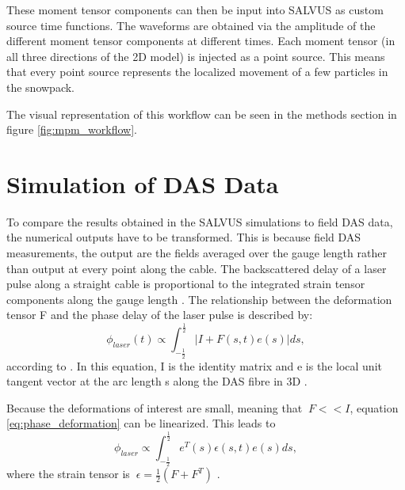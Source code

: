 These moment tensor components can then be input into SALVUS as custom source time functions. The waveforms are obtained via the amplitude of the different moment tensor components at different times. Each moment tensor (in all three directions of the 2D model) is injected as a point source. This means that every point source represents the localized movement of a few particles in the snowpack. \par

The visual representation of this workflow can be seen in the methods section in figure  \ref{fig:mpm_workflow}. 

\section{Simulation of DAS Data}
\label{sec:das_theory}

To compare the results obtained in the SALVUS simulations to field DAS data, the numerical outputs have to be transformed. This is because field DAS measurements, the output are the fields averaged over the gauge length \parencite{lindseyFiberOpticSeismology2021} rather than output at every point along the cable. The backscattered delay of a laser pulse along a straight cable is proportional to the integrated strain tensor components along the gauge length \parencite{noeFrontiersFullwaveformSeismology2025}. The relationship between the deformation tensor F and the phase delay of the laser pulse is described by: \begin{equation}
  \phi_{laser}(t) \propto \int_{-\frac{1}{2}}^{\frac{1}{2}} |I+F(s,t)e(s)|ds
  \label{eq:phase_deformation},
\end{equation} according to \cite{fichtnerTheoryPhaseTransmission2022}. In this equation, I is the identity matrix and e is the local unit tangent vector at the arc length s along the DAS fibre in 3D \parencite{noeFrontiersFullwaveformSeismology2025}. \par 

Because the deformations of interest are small, meaning that $\ F << I$, equation \ref{eq:phase_deformation} can be linearized. This leads to \begin{equation}
  \phi_{laser} \propto \int_{-\frac{1}{2}}^{\frac{1}{2}}e^T(s)\epsilon(s,t)e(s)ds
  \label{eq:linearized_phase_deformation},
\end{equation} where the strain tensor is $\ \epsilon = \frac{1}{2} (F+F^T)$ \parencite{fichtnerTheoryPhaseTransmission2022}. \par

